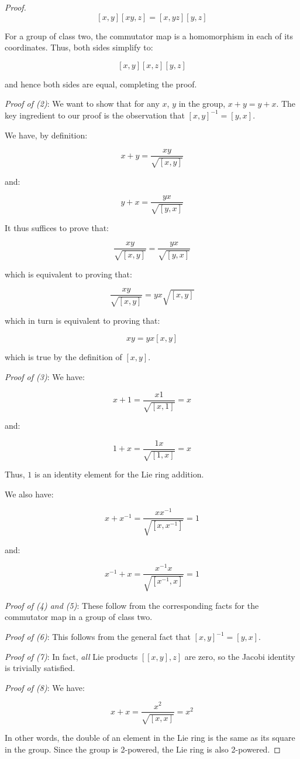 \documentclass{ucetd}
\begin{document}
\begin{proof}
  $$ [x,y][xy,z] = [x,yz][y,z]$$

  For a group of class two, the commutator map is a homomorphism in
  each of its coordinates. Thus, both sides simplify to:

  $$[x,y][x,z][y,z]$$

  and hence both sides are equal, completing the proof.

  {\em Proof of (2)}: We want to show that for any $x$, $y$ in the
  group, $x + y = y + x$. The key ingredient to our proof is the
  observation that $[x,y]^{-1} = [y,x]$.

  We have, by definition:

  $$x + y = \frac{xy}{\sqrt{[x,y]}}$$

  and:

  $$y + x = \frac{yx}{\sqrt{[y,x]}}$$

  It thus suffices to prove that:

  $$\frac{xy}{\sqrt{[x,y]}} = \frac{yx}{\sqrt{[y,x]}}$$
  
  which is equivalent to proving that:

  $$\frac{xy}{\sqrt{[x,y]}} = yx\sqrt{[x,y]}$$

  which in turn is equivalent to proving that:

  $$xy = yx[x,y]$$

  which is true by the definition of $[x,y]$.

  {\em Proof of (3)}: We have:

  $$x + 1 = \frac{x1}{\sqrt{[x,1]}} = x$$

  and:

  $$1 + x = \frac{1x}{\sqrt{[1,x]}} = x$$

  Thus, $1$ is an identity element for the Lie ring addition.

  We also have:

  $$x + x^{-1} = \frac{xx^{-1}}{\sqrt{[x,x^{-1}]}} = 1$$

  and:

  $$x^{-1} + x = \frac{x^{-1}x}{\sqrt{[x^{-1},x]}} = 1$$

  {\em Proof of (4) and (5)}: These follow from the corresponding
  facts for the commutator map in a group of class two.

  {\em Proof of (6)}: This follows from the general fact that
  $[x,y]^{-1} = [y,x]$.

  {\em Proof of (7)}: In fact, {\em all} Lie products $[[x,y],z]$ are
  zero, so the Jacobi identity is trivially satisfied.

  {\em Proof of (8)}: We have:

  $$x + x = \frac{x^2}{\sqrt{[x,x]}} = x^2$$

  In other words, the double of an element in the Lie ring is the same
  as its square in the group. Since the group is 2-powered, the Lie
  ring is also 2-powered.
\end{proof}
\end{document}

